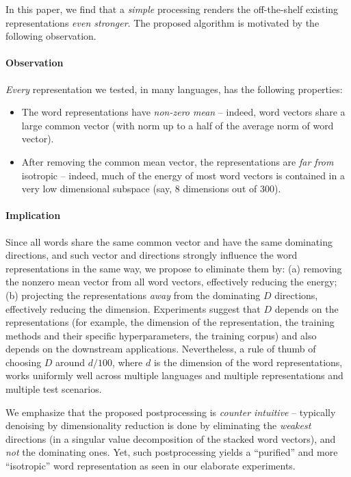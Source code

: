 \documentclass{article} \usepackage{acl2017,times}
\begin{document}
In this paper, we find that  a {\em simple} processing renders the off-the-shelf existing  representations {\em even stronger}. The proposed  algorithm is motivated by the following observation.

\paragraph{Observation}   {\em Every} representation we tested, in many languages,  has the following properties: 
\begin{itemize}\item The word representations have {\em non-zero mean} -- indeed, word vectors share a large  common vector (with norm up to a half of the average norm of word vector). 
\item After removing the common mean vector, the representations are {\em far from} isotropic -- indeed,  much of the energy of most word vectors is contained in a very low dimensional subspace (say, 8 dimensions out  of 300). 
\end{itemize} 


\paragraph{Implication} Since all words share the same common vector and have the same dominating directions, and such vector and directions strongly influence the word representations in the same way, we propose to eliminate them by: (a) removing the nonzero mean vector from all word vectors, effectively reducing the energy;  (b) projecting the representations {\em away} from the dominating $D$ directions, effectively reducing the dimension. Experiments suggest that $D$ depends on the representations (for example, the dimension of the representation, the training methods and their specific hyperparameters, the training corpus) and also depends on the downstream applications. Nevertheless, a rule of thumb of choosing $D$ around $d/100$, where $d$ is the dimension of the word representations, works uniformly well across multiple languages and multiple representations and multiple test scenarios. 

We emphasize that the proposed postprocessing is {\em counter intuitive} -- typically  denoising by dimensionality reduction is done by eliminating the {\em weakest} directions (in a singular value decomposition of the stacked word vectors), and {\em not} the  dominating ones. Yet, such postprocessing yields a ``purified'' and  more ``isotropic'' word representation as seen in our elaborate experiments. 
\end{document}
